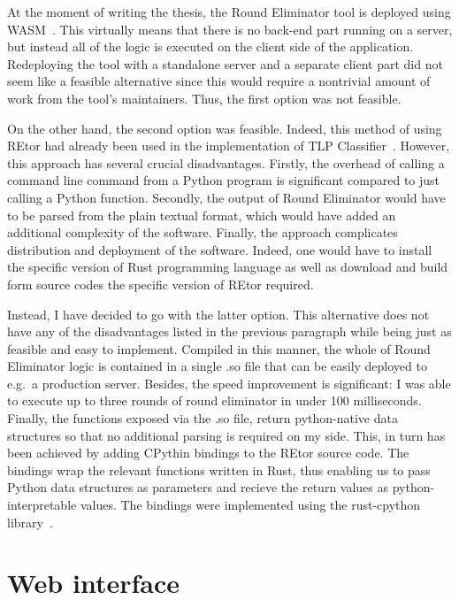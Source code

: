 At the moment of writing the thesis, the Round Eliminator tool
is deployed using WASM~\cite{WASM}. This virtually means that
there is no back-end part running on a server, but instead
all of the logic is executed on the client side of the application.
Redeploying the tool with a standalone server and a separate client
part did not seem like a feasible alternative since this would
require a nontrivial amount of work from the tool's maintainers.
Thus, the first option was not feasible.

On the other hand, the second option was feasible. Indeed,
this method of using REtor had already been used in the
implementation of TLP Classifier~\cite{Rocher2020clas}. However,
this approach has several crucial disadvantages.
Firstly, the overhead of calling a command line command
from a Python program is significant compared to just calling
a Python function. Secondly, the output of Round Eliminator
would have to be parsed from the plain textual format, which
would have added an additional complexity of the software.
Finally, the approach complicates distribution and deployment of
the software. Indeed, one would have to install the specific
version of Rust programming language as well as download and
build form source codes the specific version of REtor required.

Instead, I have decided to go with the latter option. This
alternative does not have any of the disadvantages listed
in the previous paragraph while being just as feasible and
easy to implement. Compiled in this manner, the whole of
Round Eliminator logic is contained in a single .so file
that can be easily deployed to e.g.\ a production server.
Besides, the speed improvement is significant: I was
able to execute up to three rounds of round eliminator
in under 100 milliseconds. Finally, the functions
exposed via the .so file, return python-native
data structures so that no additional parsing is required on my side.
This, in turn has been achieved by adding CPythin bindings
to the REtor source code. The bindings wrap the relevant functions
written in Rust, thus enabling us to pass Python data structures
as parameters and recieve the return values as python-interpretable values.
The bindings were implemented using the rust-cpython library~\cite{RustCPython}.


\section{Web interface}
\label{section:webinterface}

